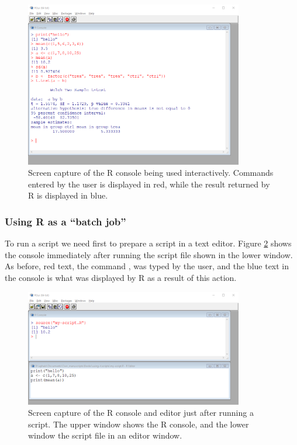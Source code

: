 \documentclass[krantz2,ChapterTOCs]{krantz}\usepackage{knitr}
\begin{document}
\begin{figure}
  \centering
  \includegraphics[width=0.85\textwidth]{figures/R-console-capture}
  \caption[Screen capture of the R console]{Screen capture of the R console being used interactively. Commands entered by the user is displayed in red, while the result returned by R is displayed in blue.}\label{fig:intro:console}
\end{figure}

\subsubsection{Using R as a ``batch job''}

To run a script we need first to prepare a script in a text editor. Figure \ref{fig:intro:script} shows the console immediately after running the script file shown in the lower window. As before, red text, the command , was typed by the user, and the blue text in the console is what was displayed by R as a result of this action.

\begin{figure}
  \centering
  \includegraphics[width=0.85\textwidth]{figures/R-console-script}
  \caption[Script sourced at the R console]{Screen capture of the R console and editor just after running a script. The upper window shows the R console, and the lower window the script file in an editor window. }\label{fig:intro:script}
\end{figure}
\end{document}
